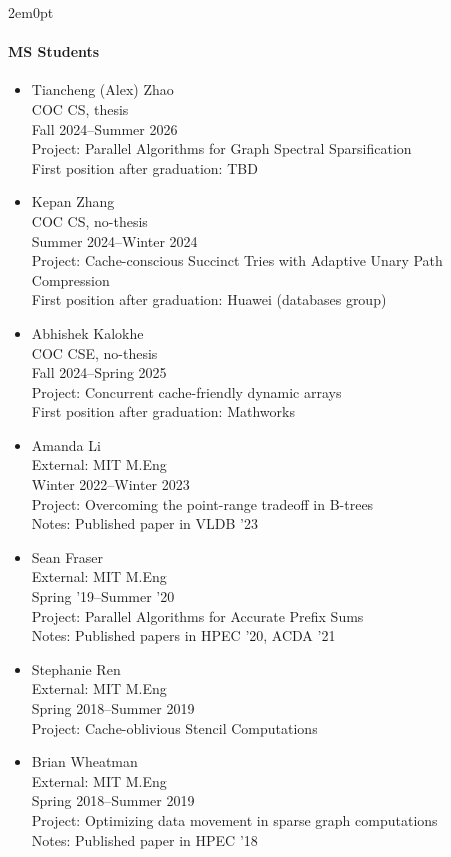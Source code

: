 \begin{adjustwidth}{2em}{0pt}
\paragraph{MS Students}
\begin{itemize}
    \item Tiancheng (Alex) Zhao \\
        COC CS, thesis \\
        Fall 2024--Summer 2026 \\
        Project: Parallel Algorithms for Graph Spectral Sparsification \\
First position after graduation: TBD
    \item Kepan Zhang \\
        COC CS, no-thesis \\
        Summer 2024--Winter 2024 \\
        Project: Cache-conscious Succinct Tries with Adaptive Unary Path
        Compression \\
        First position after graduation: Huawei (databases group)
       \item Abhishek Kalokhe \\
        COC CSE, no-thesis \\
        Fall 2024--Spring 2025 \\
        Project: Concurrent cache-friendly dynamic arrays\\
	First position after graduation: Mathworks
    \item Amanda Li \\
        External: MIT M.Eng \\
        Winter 2022--Winter 2023 \\
        Project: Overcoming the point-range tradeoff in B-trees\\
        Notes: Published paper in VLDB '23
    \item Sean Fraser \\
        External: MIT M.Eng \\
        Spring '19--Summer '20 \\
        Project: Parallel Algorithms for Accurate Prefix Sums\\
        Notes: Published papers in HPEC '20, ACDA '21
    \item Stephanie Ren \\
        External: MIT M.Eng \\
        Spring 2018--Summer 2019 \\
        Project: Cache-oblivious Stencil Computations
    \item Brian Wheatman \\
        External: MIT M.Eng \\
        Spring 2018--Summer 2019 \\
        Project: Optimizing data movement in sparse graph computations\\
        Notes: Published paper in HPEC '18
        \end{itemize}


\end{adjustwidth}
